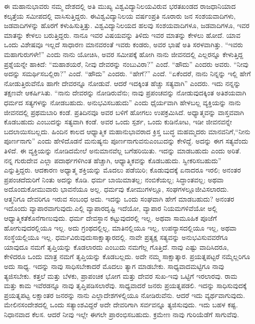ಈ ಮಹಾನುಭಾವರು ನಮ್ಮ ದೇಶದಲ್ಲಿ ಅತಿ ಮುಖ್ಯ ವಿಶ್ವವಿದ್ಯಾನಿಲಯವಿರುವ ಭರತಖಂಡದ ರಾಜಧಾನಿಯಾದ ಕಲ್ಕತ್ತೆಯ ಸಮೀಪದಲ್ಲಿ ವಾಸಿಸುತ್ತಿದ್ದರು. ಈ\break ವಿಶ್ವವಿದ್ಯಾನಿಲಯ ವರ್ಷಂಪ್ರತಿ ನೂರಾರು ಜನ ಸಂಶಯವಾದಿಗಳು, ಜಡವಾದಿಗಳನ್ನು ಹೊರಗೆ ಕಳುಹಿಸುತ್ತಿತ್ತು. ವಿಶ್ವವಿದ್ಯಾನಿಲಯದ ಹಲವು ಸಂಶಯವಾದಿಗಳೂ, ಜಡವಾದಿಗಳೂ, ಇವರ ಮಾತನ್ನು ಕೇಳಲು ಬರುತ್ತಿದ್ದರು. ನಾನೂ ಇವರ ವಿಷಯವನ್ನು ತಿಳಿದು ಇವರ ಮಾತನ್ನು ಕೇಳಲು ಹೋದೆ. ಯಾವ ಒಂದು ವಿಶೇಷವೂ ಇಲ್ಲದೆ ಸಾಧಾರಣ ಮಾನವರಂತೆ ಇವರು ಕಂಡರು, ಅವರ ಭಾಷೆ ಅತಿ ಸರಳವಾಗಿತ್ತು. “ಇವರು ಮಹಾಗುರುಗಳೇ!” ಎಂದು ನಾನು ಯೋಚಿಸಿ, ಅವರ ಸಮೀಪಕ್ಕೆ ಹೋಗಿ ನಾನು ಜೀವನದಲ್ಲಿ ಎಲ್ಲರನ್ನೂ ಕೇಳುತ್ತಿದ್ದ ಪ್ರಶ್ನೆಯನ್ನೇ ಹಾಕಿದೆ: “ಮಹಾಶಯರೆ, ನೀವು ದೇವರನ್ನು ನಂಬುವಿರಾ?” ಎಂದೆ. “ಹೌದು” ಎಂದರು ಅವರು. “ನೀವು ಅದನ್ನು ಸಮರ್ಥಿಸಬಲ್ಲಿರಾ?” ಎಂದೆ. “ಹೌದು” ಎಂದರು. “ಹೇಗೆ?” ಎಂದೆ. “ಏಕೆಂದರೆ, ನಾನು ನಿನ್ನನ್ನು ಇಲ್ಲಿ ಹೇಗೆ ನೋಡುತ್ತಿರುವೆನೊ ಹಾಗೇ ದೇವರನ್ನೂ ನೋಡುವೆ. ಆದರೆ ಇದಕ್ಕಿಂತ ಹೆಚ್ಚು ಸತ್ಯವಾಗಿ” ಎಂದರು. ಇದು ನನ್ನನ್ನು ತಕ್ಷಣವೇ ಆಕರ್ಷಿಸಿತು. “ನಾನು ದೇವರನ್ನು ನೋಡಿರುವೆನು; ನಾವು ಪ್ರಪಂಚವನ್ನು ನೋಡುವುದಕ್ಕಿಂತ ಅತಿಶಯವಾಗಿ ಧರ್ಮದ ಸತ್ಯಗಳನ್ನು ನೋಡಬಹುದು. ಅನುಭವಿಸಬಹುದು” ಎಂದು ಧೈರ್ಯವಾಗಿ ಹೇಳಬಲ್ಲ ವ್ಯಕ್ತಿಯನ್ನು ನಾನು ಜೀವನದಲ್ಲಿ ಪ್ರಥಮಬಾರಿ ಕಂಡೆ. ಪ್ರತಿದಿನವೂ ಅವರ ಬಳಿಗೆ ಹೋಗಲು ಉಪಕ್ರಮಿಸಿದೆ. ಅಧ್ಯಾತ್ಮವನ್ನು ವಾಸ್ತವವಾಗಿ ಕೊಡಬಹುದು ಎಂಬುದನ್ನು ಸತ್ಯವಾಗಿ ಕಂಡೆ. ಅವರ ಒಂದು ಸ್ಪರ್ಶ, ಒಂದು ಕುಡಿನೋಟ, ಇಡೀ ಜೀವನವನ್ನೇ ಬದಲಾಯಿಸಬಲ್ಲದು. ಹಿಂದಿನ ಕಾಲದ ಆಧ್ಯಾತ್ಮಿಕ ಮಹಾನುಭಾವರಾದ ಕ್ರಿಸ್ತ ಬುದ್ಧ ಮಹಮ್ಮದರು ಮಾನವನಿಗೆ,\break “ನೀನು ಪೂರ್ಣನಾಗು” ಎಂದು ಹೇಳಿದೊಡನೆ ಮನುಷ್ಯನು ಪೂರ್ಣನಾಗುವನು\break ಎಂಬುದನ್ನು ಕೇಳಿದ್ದೆ. ಅದನ್ನು ಈಗ ಸತ್ಯವೆಂದು ತಿಳಿದೆ. ಈ ವ್ಯಕ್ತಿಯನ್ನು ನೋಡಿದ\break ಮೇಲೆ ಅನುಮಾನವೆಲ್ಲ ಬಗೆಹರಿಯಿತು. ಇದನ್ನು ಮಾಡಬಹುದು ಎಂದು ಅರಿತೆ. ನನ್ನ ಗುರುದೇವ ಎಲ್ಲಾ ಪದಾರ್ಥಗಳಿಗಿಂತ ಹೆಚ್ಚಾಗಿ, ಆಧ್ಯಾತ್ಮಿಕವನ್ನು ಕೊಡಬಹುದು. ಸ್ವೀಕರಿಸಬಹುದು” ಎನ್ನುತ್ತಿದ್ದರು. ಆದಕಾರಣ ಅಧ್ಯಾತ್ಮ ಶಕ್ತಿಯನ್ನು ಮೊದಲು ಪಡೆಯಿರಿ; ಕೊಡುವುದಕ್ಕೆ ಏನಾದರೂ ಇರಲಿ; ಅನಂತರ ಪ್ರಪಂಚದೆದುರಿಗೆ ನಿಂತು ಅದನ್ನು ಕೊಡಿ. ಧರ್ಮ ಬಾಯಿಮಾತಲ್ಲ; ನಂಬಿಕೆಯಲ್ಲ; ಸಿದ್ಧಾಂತವಲ್ಲ; ಅಥವಾ ಅದೊಂದು\break ಕೋಮುವಾರು ಭಾವನೆಯೂ ಅಲ್ಲ. ಧರ್ಮವು ಕೋಮುಗಳಲ್ಲೂ, ಸಂಘಗಳಲ್ಲೂ\break ಜೀವಿಸಲಾರದು. ಆತ್ಮನಿಗೂ ದೇವರಿಗೂ ಇರುವ ಸಂಬಂಧ ಅದು. ಇದನ್ನು ಒಂದು ಸಂಘವಾಗಿ ಹೇಗೆ ಮಾಡಬಹುದು? ಅನಂತರ ಇದೊಂದು ವ್ಯಾಪಾರವಾಗುವುದು.\break ಎಲ್ಲಿ ವ್ಯಾಪಾರದೃಷ್ಟಿ ಇದೆಯೋ, ವ್ಯಾಪಾರ ನಿಯಮಗಳಿವೆಯೋ ಅಲ್ಲಿ ಆಧ್ಯಾತ್ಮಿಕತೆ\break ಕೊನೆಗಾಣುವುದು. ಧರ್ಮ ದೇವಸ್ಥಾನ ಕಟ್ಟುವುದರಲ್ಲಿ ಇಲ್ಲ. ಅಥವಾ ಸಾಮೂಹಿಕ ಪೂಜೆಗೆ ಹೋಗುವುದರಲ್ಲಿಯೂ ಇಲ್ಲ. ಅದು ಗ್ರಂಥದಲ್ಲಿಲ್ಲ, ಮಾತಿನಲ್ಲಿಯೂ ಇಲ್ಲ, ಉಪನ್ಯಾಸದಲ್ಲಿಯೂ ಇಲ್ಲ, ಅಥವಾ ಸಂಸ್ಥೆಯಲ್ಲಿಯೂ ಇಲ್ಲ. ಧರ್ಮವಿರುವುದು\break ಸಾಕ್ಷಾತ್ಕಾರದಲ್ಲಿ. ನಾವೇ ಪ್ರತ್ಯಕ್ಷ ಸತ್ಯವನ್ನು ಅನುಭವಿಸುವವರೆಗೂ ಯಾವುದೂ ನಮಗೆ ತೃಪ್ತಿಯನ್ನು ಕೊಡಲಾರದು ಎಂಬುದು ನಮಗೆಲ್ಲ ಗೊತ್ತಿದೆ. ನಾವು ಎಷ್ಟು ವಾದಿಸಿದರೂ, ಕೇಳಿದರೂ ಒಂದು ಮಾತ್ರ ನಮಗೆ ತೃಪ್ತಿಯನ್ನು ಕೊಡಬಲ್ಲದು. ಅದೇ ನಮ್ಮ ಸಾಕ್ಷಾತ್ಕಾರ. ಪ್ರಯತ್ನಪಟ್ಟರೆ ನಮ್ಮೆಲ್ಲರಿಗೂ ಅದು ಸಾಧ್ಯ. ಇದನ್ನು ನಾವು ಸಾಧಿಸಬೇಕಾದರೆ ಮೊದಲು ತ್ಯಾಗ ಮಾಡಬೇಕು. ಸಾಧ್ಯವಾದಮಟ್ಟಿಗೂ ನಾವು ತ್ಯಜಿಸಬೇಕು. ಕತ್ತಲೆ ಮತ್ತು ಬೆಳಕು, ಪ್ರಾಪಂಚಿಕ ಭೋಗ ಮತ್ತು ದೇವರ ಸುಖ-ಇವು ಒಟ್ಟಿಗೆ ಇರಲಾರವು. ರಾಮ ಮತ್ತು ಕಾಮ ಇವೆರಡನ್ನೂ ನಾವು ತೃಪ್ತಿಪಡಿಸಲಾರೆವು. ಸಾಧ್ಯವಾದರೆ ಜನರು ಪ್ರಯತ್ನಪಡಲಿ. ಇದನ್ನು ಸಾಧಿಸುವುದಕ್ಕೆ ಪ್ರಯತ್ನಪಟ್ಟ ಲಕ್ಷಾಂತರ ಜನರನ್ನು ನಾನು ಎಲ್ಲಾ\break ದೇಶಗಳಲ್ಲಿಯೂ ನೋಡಿರುವೆನು. ಆದರೆ ಇದು ವ್ಯರ್ಥವಾಗುವುದು. ಮೇಲಿನ\break ಸಂದೇಶದಲ್ಲಿ ಒಂದು ಸತ್ಯಾಂಶವಿದ್ದರೆ ಅದೇ ದೇವರಿಗಾಗಿ ಸರ್ವವನ್ನೂ ತ್ಯಜಿಸುವುದು. ಇದು ಬಹಳ ಕಷ್ಟ. ನಿಧಾನವಾದ ಕೆಲಸ. ಆದರೆ ನೀವು ಇಲ್ಲೇ ಈಗಲೇ ಪ್ರಾರಂಭಿಸಬಹುದು. ಕ್ರಮೇಣ ನಾವು ಗುರಿಯೆಡೆಗೆ ಸಾಗುವೆವು.

